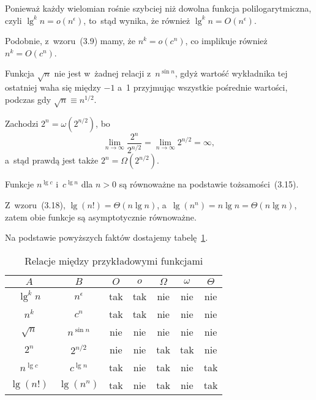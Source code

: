 \subproblem %
Ponieważ każdy wielomian rośnie szybciej niż dowolna funkcja polilogarytmiczna, czyli $\lg^kn=o(n^\epsilon)$, to~stąd wynika, że również $\lg^kn=O(n^\epsilon)$.

\subproblem %
Podobnie, z~wzoru~(3.9) mamy, że $n^k=o(c^n)$, co implikuje również $n^k=O(c^n)$.

\subproblem %
Funkcja $\sqrt{n}$ nie jest w~żadnej relacji z~$n^{\sin n}$, gdyż wartość wykładnika tej ostatniej waha się między $-1$ a~1 przyjmując wszystkie pośrednie wartości, podczas gdy $\sqrt{n}\equiv n^{1/2}$.

\subproblem %
Zachodzi $2^n=\omega(2^{n/2})$, bo
\[
	\lim_{n\to\infty}\frac{2^n}{2^{n/2}} = \lim_{n\to\infty}2^{n/2} = \infty,
\]
a~stąd prawdą jest także $2^n=\Omega(2^{n/2})$.

\subproblem %
Funkcje $n^{\lg c}$ i~$c^{\lg n}$ dla $n>0$ są równoważne na podstawie tożsamości~(3.15).

\subproblem %
Z~wzoru~(3.18), $\lg(n!)=\Theta(n\lg n)$, a~$\lg(n^n)=n\lg n=\Theta(n\lg n)$, zatem obie funkcje są asymptotycznie równoważne.

\bigskip
\noindent Na podstawie powyższych faktów dostajemy tabelę~\ref{tab:3-2}.
\begin{table}[ht]
	\begin{center}
		\begin{tabular}{cc|c|c|c|c|c|}
			$A$ & $B$ & $O$ & $o$ & $\Omega$ & $\omega$ & $\Theta$ \\
			\hline
			$\lg^kn$ & $n^\epsilon$ & tak & tak & nie & nie & nie \\
			\hline
			$n^k$ & $c^n$ & tak & tak & nie & nie & nie \\
			\hline
			$\sqrt{n}$ & $n^{\sin n}$ & nie & nie & nie & nie & nie \\
			\hline
			$2^n$ & $2^{n/2}$ & nie & nie & tak & tak & nie \\
			\hline
			$n^{\lg c}$ & $c^{\lg n}$ & tak & nie & tak & nie & tak \\
			\hline
			$\lg(n!)$ & $\lg(n^n)$ & tak & nie & tak & nie & tak \\
			\hline
		\end{tabular}
		\caption{Relacje między przykładowymi funkcjami} \label{tab:3-2}
	\end{center}
\end{table}


